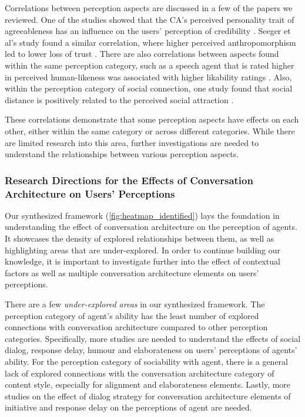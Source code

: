 Correlations between perception aspects are discussed in a few of the papers we reviewed. One of the studies showed that the CA's perceived personality trait of agreeableness has an influence on the users' perception of credibility \cite{andrews2012system}\cmt{[38]}. Seeger et al's study found a similar correlation, where higher perceived anthropomorphism led to lower loss of trust \cite{seeger2021chatbots}\cmt{[35]}. There are also correlations between aspects found within the same perception category, such as a speech agent that is rated higher in perceived human-likeness was associated with higher likability ratings \cite{zhu2022effects}\cmt{[26]}. Also, within the perception category of social connection, one study found that social distance is positively related to the perceived social attraction \cite{westerman2019believe}\cmt{[9]}.
 
These correlations demonstrate that some perception aspects have effects on each other, either within the same category or across different categories. While there are limited research into this area, further investigations are needed to understand the relationships between various perception aspects.


\subsubsection{Research Directions for the Effects of Conversation Architecture on Users' Perceptions}

Our synthesized framework (\autoref{fig:heatmap_identified}) lays the foundation in understanding the effect of conversation architecture on the perception of agents. It showcases the density of explored relationships between them, as well as highlighting areas that are under-explored. In order to continue building our knowledge, it is important to investigate further into the effect of contextual factors as well as multiple conversation architecture elements on users' perceptions.

There are a few \textit{under-explored areas} in our synthesized framework. The perception category of agent's ability has the least number of explored connections with conversation architecture compared to other perception categories. Specifically, more studies are needed to understand the effects of social dialog, response delay, humour and elaborateness on users' perceptions of agents' ability. For the perception category of sociability with agent, there is a general lack of explored connections with the conversation architecture category of content style, especially for alignment and elaborateness elements. Lastly, more studies on the effect of dialog strategy for conversation architecture elements of initiative and response delay on the perceptions of agent are needed.

